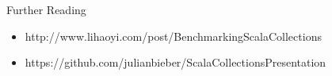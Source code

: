 \documentclass[xcolor=svgnames]{beamer}
\begin{document}


    \begin{frame}
    {Further Reading}
        \begin{itemize}
            \item http://www.lihaoyi.com/post/BenchmarkingScalaCollections
            \item https://github.com/julianbieber/ScalaCollectionsPresentation
        \end{itemize}
    \end{frame}
\end{document}
